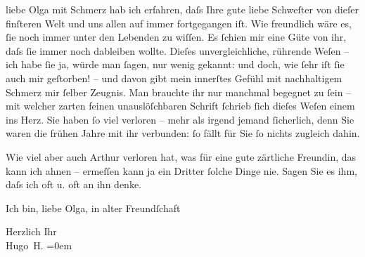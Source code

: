 \pstart{}liebe Olga\pend\vspace{0.5em}
\pstart
           mit Schmerz hab ich erfahren, daſs Ihre gute liebe Schweſter von dieſer finſteren Welt und uns allen auf immer
               fortgegangen iſt. Wie freundlich wäre es,{ }ſie noch immer unter den Lebenden zu
               wiſſen. Es{ }ſchien mir eine Güte von ihr, daſs{ }ſie immer noch dableiben wollte. Dieſes
               unvergleichliche, rührende Weſen – ich habe{ }ſie ja, {\pb}würde man{ }ſagen,
               nur wenig gekannt: und doch, wie{ }ſehr iſt{ }ſie auch mir geſtorben! – und davon gibt
               mein innerſtes Gefühl mit nachhaltigem Schmerz mir{ }ſelber Zeugnis. Man brauchte ihr
               nur manchmal begegnet zu{ }ſein – mit welcher zarten feinen unauslöſchbaren Schrift{ }ſchrieb{ }ſich dieſes Weſen
               einem ins Herz. Sie haben{ }ſo viel {\pb}verloren – mehr als
               irgend jemand{ }ſicherlich, denn Sie waren die frühen Jahre mit ihr verbunden:{ }ſo fällt
               für Sie{ }ſo nichts zugleich dahin.\pend
           
\pstart
           Wie viel aber auch Arthur verloren hat, was für
               eine gute zärtliche Freundin, das kann ich ahnen – ermeſſen kann ja ein Dritter{ }ſolche Dinge nie. Sagen Sie es ihm, daſs ich oft u. oft an ihn denke.\pend
           
\pstart
           {\pb}Ich bin, liebe Olga, in alter Freundſchaft\pend
           
\pstart
           Herzlich Ihr{\\[\baselineskip]}\spacefill\mbox{Hugo H.}\pend
           \leftskip=0em{}\endnumbering{}  \newcommand{\dateiname}{L02340}\newcommand{\titel}{Hugo Hofmannsthal an Olga Schnitzler, 17. 4. 1920}\newcommand{\editorInnen}{Herausgegeben von Martin Anton Müller}
